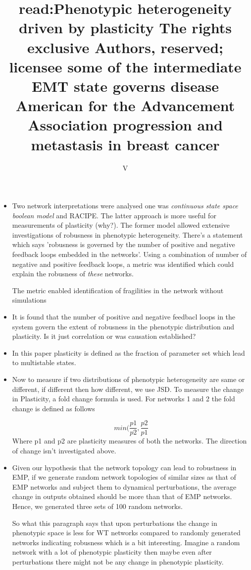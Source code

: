 \documentclass{article}
\title{read:Phenotypic heterogeneity driven by plasticity
 The rights exclusive Authors, reserved;
 licensee
 some
of the intermediate EMT state governs disease
 American for the Advancement
 Association
progression and metastasis in breast cancer
}
\author{V}
\begin{document}
\maketitle

\begin{itemize}

\item Two network interpretations were analysed one was \textit{ continuous state space boolean model  } and RACIPE. The latter approach is more useful for measurements of plasticity (why?). The former model allowed extensive investigations of robusness in phenotypic heterogeneity. There's a statement which says 'robusness is governed by the number of positive and negative feedback loops embedded in the networks'. Using a combination of number of negative and positive feedback loops, a metric was identified which could explain the robusness of \textit{ these } networks. 

	The metric enabled identification of fragilities in the network without simulations

\item It is found that the number of positive and negative feedbacl loops in the system govern the extent of robusness in the phenotypic distribution and plasticity. Is it just correlation or was causation established? 

\item In this paper plasticity is defined as the fraction of parameter set which lead to multistable states. 

\item Now to measure if two distributions of phenotypic heterogeneity are same or different, if different then how different, we use JSD. To measure the change in Plasticity, a fold change formula is used. For networks 1 and 2 the fold change is defined as follows 

	\[  min( \frac {p1} {p2}, \frac {p2} {p1}                      \]
Where p1 and p2 are plasticity measures of both the networks.
The direction of change isn't investigated above. 


\item Given our hypothesis that the network topology can lead to robustness in EMP, if we generate random network topologies of similar sizes as that of EMP networks and subject them to dynamical perturbations, the average change in outputs obtained should be more than that of EMP networks. Hence, we generated three sets of 100 random networks. 

	So what this paragraph says that upon perturbations the change in phenotypic space is less for WT networks compared to randomly generated networks indicating robusness which is a bit interesting. Imagine a random network with a lot of phenotypic plasticity then maybe even after perturbations there might not be any change in phenotypic plasticity. 



\end{itemize}
\end{document}
